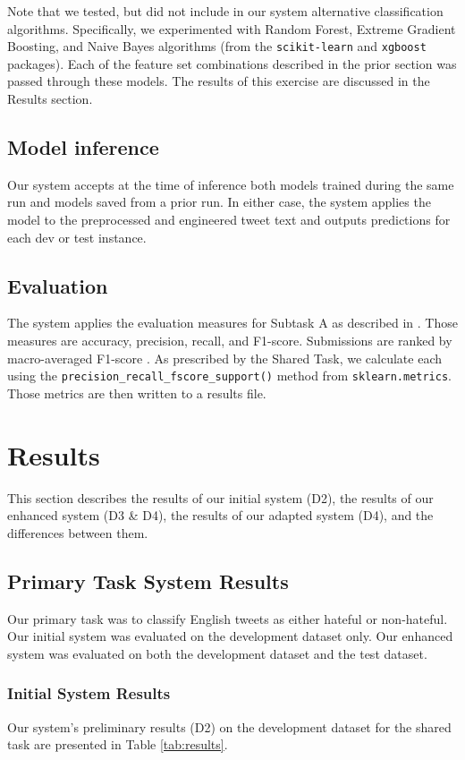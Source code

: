 \documentclass[11pt,a4paper]{article}
\begin{document}
Note that we tested, but did not include in our system alternative classification algorithms. Specifically, we experimented with Random Forest, Extreme Gradient Boosting, and Naive Bayes algorithms (from the \verb|scikit-learn| and \verb|xgboost| packages). Each of the feature set combinations described in the prior section was passed through these models. The results of this exercise are discussed in the Results section.



\subsection{Model inference}
Our system accepts at the time of inference both models trained during the same run and models saved from a prior run. In either case, the system applies the model to the preprocessed and engineered tweet text and outputs predictions for each dev or test instance.


\subsection{Evaluation}
The system applies the evaluation measures for Subtask A as described in \citet{basile-etal-2019-semeval}. Those measures are accuracy, precision, recall, and F1-score. Submissions are ranked by macro-averaged F1-score \citep{basile-etal-2019-semeval}. As prescribed by the Shared Task, we calculate each using the \verb|precision_recall_fscore_support()| method from \verb|sklearn.metrics|. Those metrics are then written to a results file.


\section{Results}
This section describes the results of our initial system (D2), the results of our enhanced system (D3 \& D4), the results of our adapted system (D4), and the differences between them.

\subsection{Primary Task System Results}
Our primary task was to classify English tweets as either hateful or non-hateful. Our initial system was evaluated on the development dataset only. Our enhanced system was evaluated on both the development dataset and the test dataset.

\subsubsection{Initial System Results}
Our system's preliminary results (D2) on the development dataset for the shared task are presented in Table \ref{tab:results}.
\end{document}
